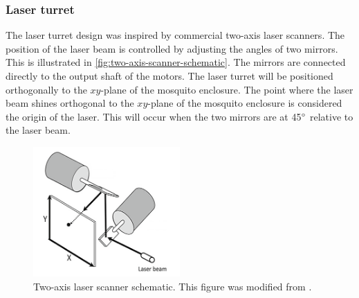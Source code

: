\subsubsection{Laser turret}\label{subsubsec:laser_turret_implementation}
The laser turret design was inspired by commercial two-axis laser scanners. The position of the laser beam is controlled by adjusting the angles of two mirrors. This is illustrated in \autoref{fig:two-axis-scanner-schematic}. The mirrors are connected directly to the output shaft of the motors. The laser turret will be positioned orthogonally to the $xy$-plane of the mosquito enclosure. The point where the laser beam shines orthogonal to the $xy$-plane of the mosquito enclosure is considered the origin of the laser. This will occur when the two mirrors are at 45$^{\circ}$ relative to the laser beam.
\begin{figure}[!htb]
  \centering
  \includegraphics[width=0.5\textwidth]{figures/hardware_design/two_axis_scanner.png}
  \caption{Two-axis laser scanner schematic. This figure was modified from \cite{two-axis-scanner-schematic}.}
  \label{fig:two-axis-scanner-schematic}
\end{figure}

